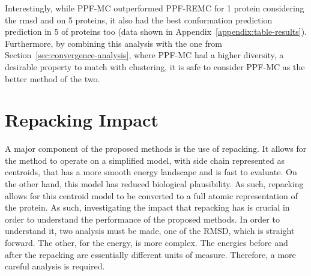 Interestingly, while PPF-MC outperformed PPF-REMC for 1 protein considering
the rmsd and on 5 proteins, it also had the best conformation prediction
prediction in 5 of proteins too (data shown in Appendix~\ref{appendix:table-results}).
Furthermore, by combining this analysis with the one
from Section~\ref{sec:convergence-analysis}, where PPF-MC had a higher
diversity, a desirable property to match with clustering, it is safe to consider
PPF-MC as the better method of the two.

\section{Repacking Impact} \label{sec:repacking-impact}

A major component of the proposed methods is the use of repacking. It allows for
the method to operate on a simplified model, with side chain represented as
centroids, that has a more smooth energy landscape and is fast to evaluate. On
the other hand, this model has reduced biological plausibility. As such,
repacking allows for this centroid model to be converted to a full atomic
representation of the protein. As such, investigating the impact that repacking
has is crucial in order to understand the performance of the proposed methods.
In order to understand it, two analysis must be made, one of the RMSD, which is
straight forward. The other, for the energy, is more complex. The energies before
and after the repacking are essentially different units of measure. Therefore, a
more careful analysis is required.

